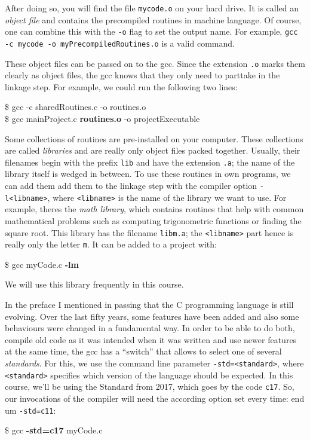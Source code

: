 After doing so, you will find the file \texttt{mycode.o} on your hard drive. It is called an \emph{object file} and contains the precompiled routines in machine language. Of course, one can combine this with the \texttt{-o} flag to set the output name. For example, \texttt{gcc -c mycode -o myPrecompiledRoutines.o} is a valid command.

These object files can be passed on to the gcc. Since the extension \texttt{.o} marks them clearly as object files, the gcc knows that they only need to parttake in the linkage step. For example, we could run the following two lines:
\begin{cmdbox}
\$ gcc -c sharedRoutines.c -o routines.o \\
\$ gcc mainProject.c \textbf{routines.o} -o projectExecutable
\end{cmdbox}

Some collections of routines are pre-installed on your computer. These collections are called \emph{libraries} and are really only object files packed together. Usually, their filenames begin with the prefix \texttt{lib} and have the extension \texttt{.a}; the name of the library itself is wedged in between. To use these routines in own programs, we can add them add them to the linkage step with the compiler option \texttt{-l<libname>}, where \texttt{<libname>} is the name of the library we want to use. For example, theres the \emph{math library}, which contains routines that help with common mathematical problems such as computing trigonometric functions or finding the square root. This library has the filename \texttt{libm.a}; the \texttt{<libname>} part hence is really only the letter \texttt{m}. It can be added to a project with:
\begin{cmdbox}
\$ gcc myCode.c \textbf{-lm}
\end{cmdbox}
We will use this library frequently in this course.

In the preface I mentioned in passing that the C programming language is still evolving. Over the last fifty years, some features have been added and also some behaviours were changed in a fundamental way. In order to be able to do both, compile old code as it was intended when it was written and use newer features at the same time, the gcc has a \enquote{switch} that allows to select one of several \emph{standards}. For this, we use the command line parameter \texttt{-std=<standard>}, where \texttt{<standard>} specifies which version of the language should be expected. In this course, we'll be using the Standard from 2017, which goes by the code \texttt{c17}. So, our invocations of the compiler will need the according option set every time:
end um \texttt{-std=c11}:
\begin{cmdbox}
\$ gcc \textbf{-std=c17} myCode.c
\end{cmdbox}

